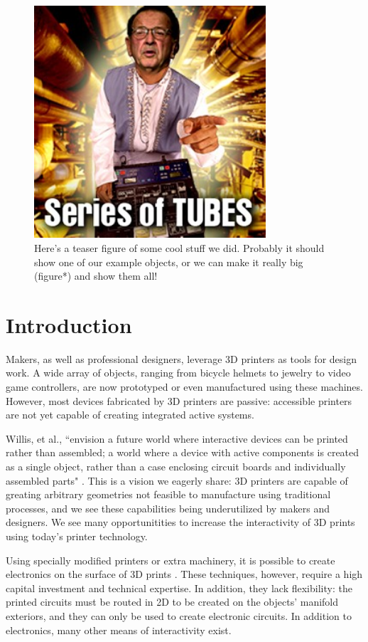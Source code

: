 \begin{figure}[h]
\centering
    \includegraphics[width=3.4in]{figures/series-of-tubes.jpg}
\caption{Here's a teaser figure of some cool stuff we did. Probably it should show one of our example objects, or we can make it really big (figure*) and show them all!}
\label{fig:teaser}
\end{figure}

\section{Introduction}
Makers, as well as professional designers, leverage 3D printers as tools for design work.  A wide array of objects, ranging from bicycle helmets to jewelry to video game controllers, are now prototyped or even manufactured using these machines.  However, most devices fabricated by 3D printers are passive: accessible printers are not yet capable of creating integrated active systems.

Willis, et al., ``envision a future world where interactive devices can be printed rather than assembled; a world where a device with active components is created as a single object, rather than a case enclosing circuit boards and individually assembled parts" \cite{Willis-printedoptics}.  This is a vision we eagerly share: 3D printers are capable of greating arbitrary geometries not feasible to manufacture using traditional processes, and we see these capabilities being underutilized by makers and designers.  We see many opportunitities to increase the interactivity of 3D prints using today's printer technology.

Using specially modified printers or extra machinery, it is possible to create electronics on the surface of 3D prints \cite{optomec} \cite{Sells-reprap}.  These techniques, however, require a high capital investment and technical expertise.  In addition, they lack flexibility: the printed circuits must be routed in 2D to be created on the objects' manifold exteriors, and they can only be used to create electronic circuits. 
In addition to electronics, many other means of interactivity exist.


